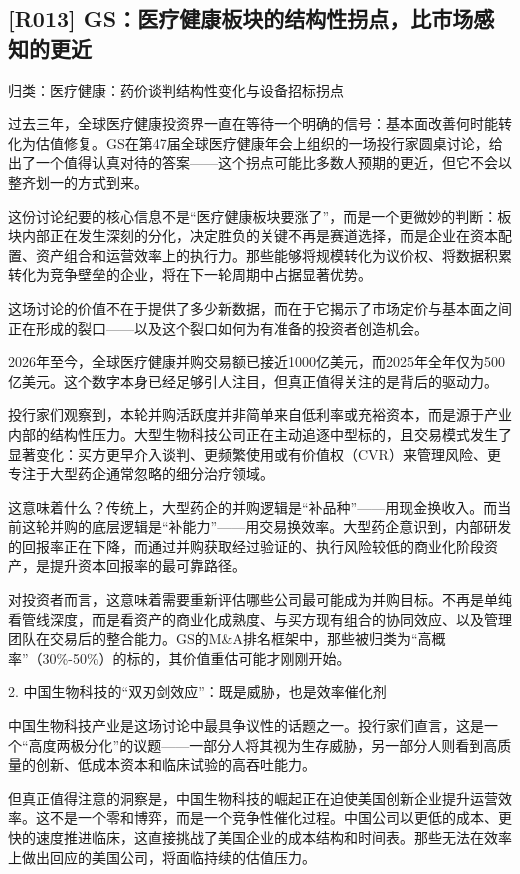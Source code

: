 \documentclass[11pt]{ctexart}
\begin{document}
\subsection{[R013] GS：医疗健康板块的结构性拐点，比市场感知的更近}
{\small\color{refgray}归类：医疗健康：药价谈判结构性变化与设备招标拐点}

过去三年，全球医疗健康投资界一直在等待一个明确的信号：基本面改善何时能转化为估值修复。GS在第47届全球医疗健康年会上组织的一场投行家圆桌讨论，给出了一个值得认真对待的答案——这个拐点可能比多数人预期的更近，但它不会以整齐划一的方式到来。

这份讨论纪要的核心信息不是“医疗健康板块要涨了”，而是一个更微妙的判断：板块内部正在发生深刻的分化，决定胜负的关键不再是赛道选择，而是企业在资本配置、资产组合和运营效率上的执行力。那些能够将规模转化为议价权、将数据积累转化为竞争壁垒的企业，将在下一轮周期中占据显著优势。

这场讨论的价值不在于提供了多少新数据，而在于它揭示了市场定价与基本面之间正在形成的裂口——以及这个裂口如何为有准备的投资者创造机会。

2026年至今，全球医疗健康并购交易额已接近1000亿美元，而2025年全年仅为500亿美元。这个数字本身已经足够引人注目，但真正值得关注的是背后的驱动力。

投行家们观察到，本轮并购活跃度并非简单来自低利率或充裕资本，而是源于产业内部的结构性压力。大型生物科技公司正在主动追逐中型标的，且交易模式发生了显著变化：买方更早介入谈判、更频繁使用或有价值权（CVR）来管理风险、更专注于大型药企通常忽略的细分治疗领域。

这意味着什么？传统上，大型药企的并购逻辑是“补品种”——用现金换收入。而当前这轮并购的底层逻辑是“补能力”——用交易换效率。大型药企意识到，内部研发的回报率正在下降，而通过并购获取经过验证的、执行风险较低的商业化阶段资产，是提升资本回报率的最可靠路径。

对投资者而言，这意味着需要重新评估哪些公司最可能成为并购目标。不再是单纯看管线深度，而是看资产的商业化成熟度、与买方现有组合的协同效应、以及管理团队在交易后的整合能力。GS的M\&A排名框架中，那些被归类为“高概率”（30\%-50\%）的标的，其价值重估可能才刚刚开始。

2. 中国生物科技的“双刃剑效应”：既是威胁，也是效率催化剂

中国生物科技产业是这场讨论中最具争议性的话题之一。投行家们直言，这是一个“高度两极分化”的议题——一部分人将其视为生存威胁，另一部分人则看到高质量的创新、低成本资本和临床试验的高吞吐能力。

但真正值得注意的洞察是，中国生物科技的崛起正在迫使美国创新企业提升运营效率。这不是一个零和博弈，而是一个竞争性催化过程。中国公司以更低的成本、更快的速度推进临床，这直接挑战了美国企业的成本结构和时间表。那些无法在效率上做出回应的美国公司，将面临持续的估值压力。
\end{document}
